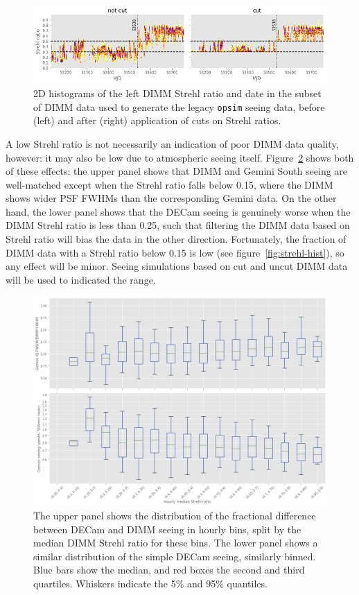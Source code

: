 \documentclass[DM,authoryear,toc]{lsstdoc}
\begin{document}
\begin{figure}
  \includegraphics[width=\columnwidth]{./figures/claver_strehl_cut.png}
  \caption{
    2D histograms of the left DIMM Strehl ratio and date in the subset
    of DIMM data used to generate the legacy \texttt{opsim} seeing data, before
    (left) and after (right) application of cuts on Strehl ratios.
  }
  \label{fig:claver-strehl-cut}
\end{figure}

A low Strehl ratio is not necessarily an indication of poor DIMM data
quality, however: it may also be low due to atmospheric seeing
itself. Figure~\ref{fig:strehl-boxplots} shows both of these effects:
the upper panel shows that DIMM and Gemini South seeing are well-matched except when the Strehl ratio falls below 0.15, where the DIMM
shows wider PSF FWHMs than the corresponding Gemini data. On the other
hand, the lower panel shows that the DECam seeing is genuinely worse
when the DIMM Strehl ratio is less than 0.25, such that filtering the
DIMM data based on Strehl ratio will bias the data in the other
direction. Fortunately, the fraction of DIMM data with a Strehl ratio
below 0.15 is low (see figure~\ref{fig:strehl-hist}), so any effect
will be minor. Seeing simulations based on cut and uncut DIMM data
will be used to indicated the range.

\begin{figure}
  \includegraphics[width=\columnwidth]{./figures/gemini_strehl_boxplots.png}
  \caption{
    The upper panel shows the distribution of the fractional
    difference between DECam and DIMM seeing in hourly bins, split by
    the median DIMM Strehl ratio for these bins. The lower panel shows
    a similar distribution of the simple DECam seeing, similarly
    binned. Blue bars show the median, and red boxes the second and
    third quartiles. Whiskers indicate the 5\% and 95\% quantiles.
    }
  \label{fig:strehl-boxplots}
\end{figure}
\end{document}
